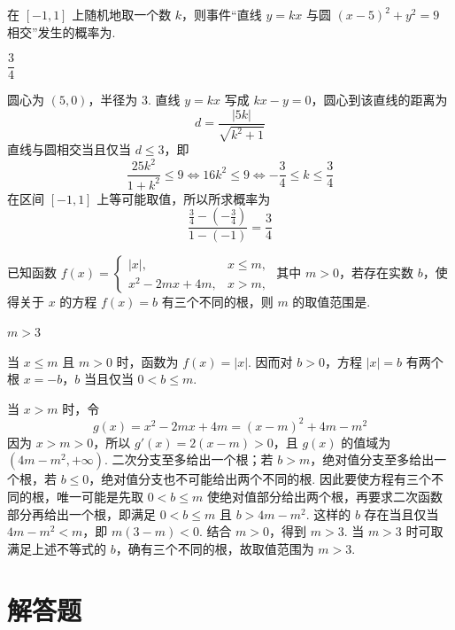 \begin{problem}
在 \([-1,1]\) 上随机地取一个数 \(k\)，则事件“直线 \(y=kx\) 与圆 \((x-5)^2+y^2=9\) 相交”发生的概率为\fillinblank{}.
\end{problem}

\begin{answer}
\(\dfrac34\)
\end{answer}

\begin{solution}
圆心为 \((5,0)\)，半径为 \(3\). 直线 \(y=kx\) 写成 \(kx-y=0\)，圆心到该直线的距离为
\[
d=\frac{|5k|}{\sqrt{k^2+1}}
\]
直线与圆相交当且仅当 \(d\leq3\)，即
\[
\frac{25k^2}{1+k^2}\leq9
\Longleftrightarrow 16k^2\leq9
\Longleftrightarrow -\frac34\leq k\leq\frac34
\]
在区间 \([-1,1]\) 上等可能取值，所以所求概率为
\[
\frac{\frac34-\left(-\frac34\right)}{1-(-1)}=\frac34
\]
\end{solution}

\begin{problem}
已知函数 \(f(x)=\begin{cases}
|x|,&x\le m,\\
x^2-2mx+4m,&x>m,
\end{cases}\) 其中 \(m>0\)，若存在实数 \(b\)，使得关于 \(x\) 的方程 \(f(x)=b\) 有三个不同的根，则 \(m\) 的取值范围是\fillinblank{}.
\end{problem}

\begin{answer}
\(m>3\)
\end{answer}

\begin{solution}
当 \(x\leq m\) 且 \(m>0\) 时，函数为 \(f(x)=|x|\). 因而对 \(b>0\)，方程 \(|x|=b\) 有两个根 \(x=-b\)，\(b\) 当且仅当 \(0<b\leq m\).

当 \(x>m\) 时，令
\[
g(x)=x^2-2mx+4m=(x-m)^2+4m-m^2
\]
因为 \(x>m>0\)，所以 \(g'(x)=2(x-m)>0\)，且 \(g(x)\) 的值域为 \((4m-m^2,+\infty)\). 二次分支至多给出一个根；若 \(b>m\)，绝对值分支至多给出一个根，若 \(b\leq0\)，绝对值分支也不可能给出两个不同的根. 因此要使方程有三个不同的根，唯一可能是先取 \(0<b\leq m\) 使绝对值部分给出两个根，再要求二次函数部分再给出一个根，即满足 \(0<b\leq m\) 且 \(b>4m-m^2\).
这样的 \(b\) 存在当且仅当 \(4m-m^2<m\)，即 \(m(3-m)<0\). 结合 \(m>0\)，得到 \(m>3\). 当 \(m>3\) 时可取满足上述不等式的 \(b\)，确有三个不同的根，故取值范围为 \(m>3\).
\end{solution}

\section{解答题}

